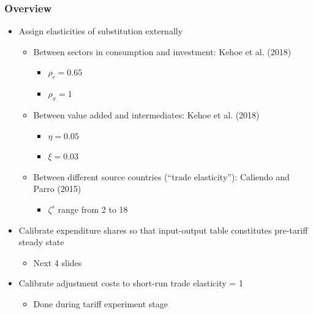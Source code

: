 \documentclass[aspectratio=169,t,10pt,table]{beamer}
\begin{document}
\begin{frame}
  \frametitle{Overview}
    \begin{itemize}\addtolength{\itemsep}{1ex}
    \item Assign elasticities of substitution externally
      \vspace{0.05cm}
    \begin{itemize}\addtolength{\itemsep}{0.75ex}
        \item Between sectors in consumption and investment: Kehoe et al. (2018)
        \begin{itemize}\addtolength{\itemsep}{0.5ex}
            \item $\rho_c=0.65$
            \item $\rho_x=1$
        \end{itemize}
            \vspace{0.05cm}
        \item Between value added and intermediates: Kehoe et al. (2018)
        \begin{itemize}\addtolength{\itemsep}{0.5ex}
        \item $\eta=0.05$
        \item $\xi=0.03$
        \end{itemize}
            \vspace{0.05cm}
        \item Between different source countries (``trade elasticity''): Caliendo and Parro (2015)
         \begin{itemize}\addtolength{\itemsep}{0.5ex}
        \item $\zeta^s$ range from 2 to 18
        \end{itemize}

    \end{itemize}
    \item Calibrate expenditure shares so that input-output table constitutes pre-tariff steady state
    \begin{itemize}
        \item Next 4 slides
    \end{itemize}
    \item Calibrate adjustment costs to short-run trade elasticity = 1
    \begin{itemize}
        \item Done during tariff experiment stage
    \end{itemize}
    \end{itemize}
\end{frame}
\end{document}

